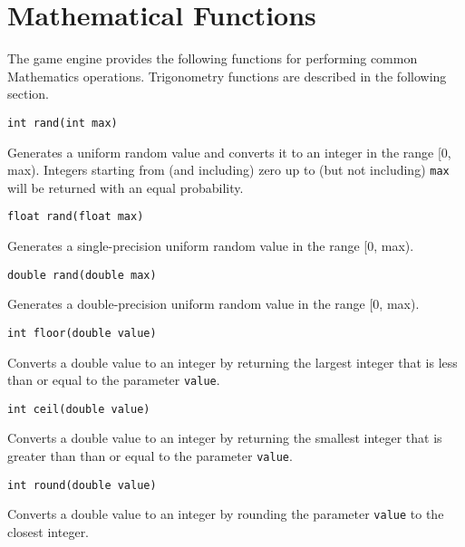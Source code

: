 \documentclass[a4paper, 10pt]{report}
\begin{document}
\vspace{1em}

\section{Mathematical Functions}

The game engine provides the following functions for performing common Mathematics operations. Trigonometry functions are described in the following section.

\hrulefill

{\large {\tt int rand(int max)}}

Generates a uniform random value and converts it to an integer in the range [0, max). Integers starting from (and including) zero up to (but not including) {\tt max} will be returned with an equal probability.

\hrulefill

{\large {\tt float rand(float max)}}

Generates a single-precision uniform random value in the range [0, max).

\hrulefill

{\large {\tt double rand(double max)}}

Generates a double-precision uniform random value in the range [0, max).

\hrulefill

{\large {\tt int floor(double value)}}

Converts a double value to an integer by returning the largest integer that is less than or equal to the parameter {\tt value}.

\hrulefill

{\large {\tt int ceil(double value)}}

Converts a double value to an integer by returning the smallest integer that is greater than than or equal to the parameter {\tt value}.

\hrulefill

{\large {\tt int round(double value)}}

Converts a double value to an integer by rounding the parameter {\tt value} to the closest integer.

\hrulefill
\end{document}
